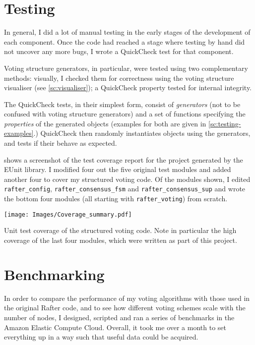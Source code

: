 \documentclass[11pt,chapterprefix=true,toc=bibliography,numbers=noendperiod,
               footnotes=multiple,twoside]{scrreprt}
\begin{document}
\section{Testing}

In general, I did a lot of manual testing in the early stages of the development of each component. Once the code had reached a stage where testing by hand did not uncover any more bugs, I wrote a QuickCheck test for that component.

Voting structure generators, in particular, were tested using two complementary methods: visually, I checked them for correctness using the voting structure visualiser (see \cref{sc:visualiser}); a QuickCheck property tested for internal integrity.

The QuickCheck tests, in their simplest form, consist of \emph{generators} (not to be confused with voting structure generators) and a set of functions specifying the \emph{properties} of the generated objects (examples for both are given in \cref{sc:testing-examples}.) QuickCheck then randomly instantiates objects using the generators, and tests if their behave as expected.

 shows a screenshot of the test coverage report for the project generated by the EUnit library. I modified four out the five original test modules and added another four to cover my structured voting code. Of the modules shown, I edited \texttt{rafter\_config}, \texttt{rafter\_consensus\_fsm} and \texttt{rafter\_consensus\_sup} and wrote the bottom four modules (all starting with \texttt{rafter\_voting}) from scratch.

\begin{table}[h]
    \centering
    \texttt{[image: Images/Coverage\_summary.pdf]}
    \caption[Unit test coverage]{Unit test coverage of the structured voting code. Note in particular the high coverage of the last four modules, which were written as part of this project.}
    \label{tab:coverage}
\end{table}

\section{Benchmarking}

In order to compare the performance of my voting algorithms with those used in the original Rafter code, and to see how different voting schemes scale with the number of nodes, I designed, scripted and ran a series of benchmarks in the Amazon Elastic Compute Cloud. Overall, it took me over a month to set everything up in a way such that useful data could be acquired.
\end{document}
